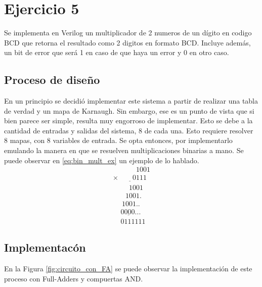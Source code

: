 \section{Ejercicio 5}
Se implementa en Verilog un multiplicador de 2 numeros de un d\'igito en codigo BCD que retorna el resultado como 2 digitos en formato BCD. Incluye adem\'as, un bit de error que ser\'a 1 en caso de que haya un error y 0 en otro caso.

\subsection{Proceso de dise\~no}
En un principio se decidi\'o implementar este sistema a partir de realizar una tabla de verdad y un mapa de Karnaugh. Sin embargo, ese es un punto de vista que si bien parece ser simple, resulta muy engorroso de implementar. Esto se debe a la cantidad de entradas y salidas del sistema, 8 de cada una. Esto requiere resolver 8 mapas, con 8 variables de entrada.
Se opta entonces, por implementarlo emulando la manera en que se resuelven multiplicaciones binarias a mano. Se puede observar en \ref{eq:bin_mult_ex} un ejemplo de lo hablado.
\begin{equation}[H]
    \begin{array}{c}
        \phantom{\times99999}1001\\
        \underline{\times\phantom{9999}0111}\\ %
        \phantom{\times 999}1001\\
        \phantom{\times 99}1001.\\
        \phantom{\times9}1001..\\        
        \underline{\phantom\times0000...\phantom9}\\
        \phantom\times0111111
    \end{array}
    \label{eq:bin_mult_ex}
\end{equation}


\subsection{Implementac\'on}
En la Figura \ref{fig:circuito_con_FA} se puede observar la implementaci\'on de este proceso con Full-Adders y compuertas AND.

